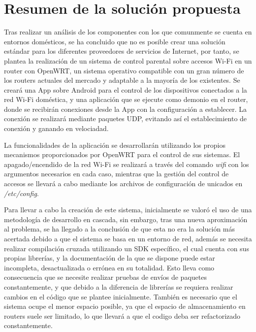 \documentclass[12pt]{article}
\begin{document}
\section{Resumen de la solución propuesta}
    Tras realizar un análisis de los componentes con los que comunmente se cuenta en entornos domésticos, se ha concluido que no es posible crear una solución estándar para los diferentes proveedores de servicios de Internet, por tanto, se plantea la realización de un sistema de control parental sobre accesos Wi-Fi en un router con OpenWRT, un sistema operativo compatible con un gran número de los routers actuales del mercado y adaptable a la mayoría de los existentes. Se creará una App sobre Android para el control de los dispositivos conectados a la red Wi-Fi doméstica, y una aplicación que se ejecute como demonio en el router, donde se recibirán conexiones desde la App con la configuración a establecer. La conexión se realizará mediante paquetes UDP, evitando así el establecimiento de conexión y ganando en velociadad.

    La funcionalidades de la aplicación se desarrollarán utilizando los propios mecanismos proporcionados por OpenWRT para el control de sus sistemas. El apagado/encendido de la red Wi-Fi se realizará a través del comando \textit{wifi} con los argumentos necesarios en cada caso, mientras que la gestión del control de accesos se llevará a cabo mediante los archivos de configuración de unicados en \textit{/etc/config}.

    Para llevar a cabo la creación de este sistema, inicialmente se valoró el uso de una metodología de desarrollo en cascada, sin embargo, tras una nueva aproximación al problema, se ha llegado a la conclusión de que esta no era la solución más acertada debido a que el sistema se basa en un entorno de red, además se necesita realizar compilación cruzada utilizando un SDK específico, el cual cuenta con sus propias librerías, y la documentación de la que se dispone puede estar incompleta, desactualizada o errónea en su totalidad. Esto lleva como consecuencia que se necesite realizar pruebas de envíos de paquetes constantemente, y que debido a la diferencia de librerías se requiera realizar cambios en el código que se plantee inicialmente. También es necesario que el sistema ocupe el menor espacio posible, ya que el espacio de almacenamiento en routers suele ser limitado, lo que llevará a que el codigo deba ser refactorizado constantemente.
    
\end{document}
